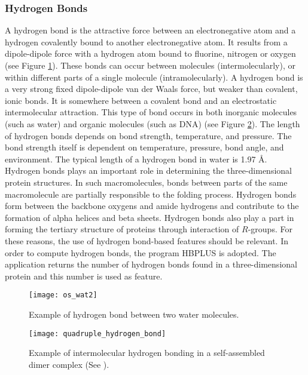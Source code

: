 \subsubsection{Hydrogen Bonds}
\label{subsubsec:hydrogen_bonds}
A hydrogen bond is the attractive force between an electronegative atom and a hydrogen covalently bound to another electronegative atom. It results from a dipole-dipole force with a hydrogen atom bound to fluorine, nitrogen or oxygen (see Figure \ref{fig:os_wat2}).
These bonds can occur between molecules (intermolecularly), or within different parts of a single molecule (intramolecularly). A hydrogen bond is a very strong fixed dipole-dipole van der Waals force, but weaker than covalent, ionic bonds. It is somewhere between a covalent bond and an electrostatic intermolecular attraction. This type of bond occurs in both inorganic molecules (such as water) and organic molecules (such as DNA) (see Figure \ref{fig:quadruple_hydrogen_bond}). 
The length of hydrogen bonds depends on bond strength, temperature, and pressure. The bond strength itself is dependent on temperature, pressure, bond angle, and environment. The typical length of a hydrogen bond in water is 1.97 \AA.\\
Hydrogen bonds plays an important role in determining the three-\-di\-men\-sio\-nal protein structures. In such macromolecules, bonds between parts of the same macromolecule are partially responsible to the folding process. Hydrogen bonds form between the backbone oxygens and amide hydrogens and contribute to the formation of alpha helices and beta sheets. Hydrogen bonds also play a part in forming the tertiary structure of proteins through interaction of $R$-groups. For these reasons, the use of hydrogen bond-based features should be relevant. In order to compute hydrogen bonds, the program HBPLUS \cite{McDonald1994aa} is adopted. The application returns the number of hydrogen bonds found in a three-\-di\-men\-sio\-nal protein and this number is used as feature.
\begin{figure}[tb]
	\begin{center}
		\texttt{[image: os\_wat2]}
		\caption[Example of hydrogen bond between two water molecules]{Example of hydrogen bond between two water molecules.}
		\label{fig:os_wat2}
	\end{center}
\end{figure}

\begin{figure}[tb]
	\begin{center}
		\texttt{[image: quadruple\_hydrogen\_bond]}
		\caption[Example of intermolecular hydrogen bonding]{Example of intermolecular hydrogen bonding in a self-assembled dimer complex (See \cite{Beijer1998sca}).}
		\label{fig:quadruple_hydrogen_bond}
	\end{center}
\end{figure}

